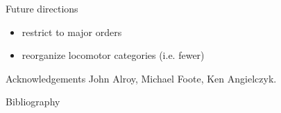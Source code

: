 \documentclass[final]{beamer}\usepackage[]{graphicx}\usepackage[]{color}
\newlength{\onecolwid}
\begin{document}
\begin{frame}[t]
\begin{columns}[t]
\begin{columns}[t,totalwidth = \onecolwid]
\begin{column}{\onecolwid}
        \begin{block}{Future directions}
          \begin{itemize}
            \item restrict to major orders \citep{Jernvall2004}
            \item reorganize locomotor categories (i.e. fewer)
          \end{itemize}
        \end{block}

        \begin{block}{Acknowledgements}
          John Alroy, Michael Foote, Ken Angielczyk.
        \end{block}

        \begin{scriptsize}
          \begin{block}{Bibliography}
            
            
          \end{block}
        \end{scriptsize}
      \end{column}
    \end{columns}

  \end{columns}
\end{frame}
\end{document}
